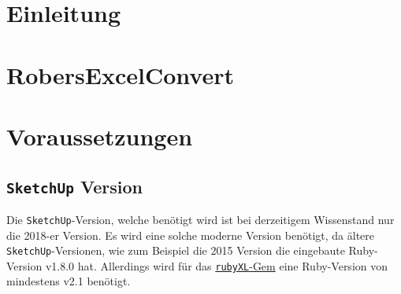 \documentclass{book}
\newcommand{\sketchup}{\texttt{SketchUp}\xspace}
\newcommand{\rubyXL}{\texttt{rubyXL}\xspace}
\begin{document}
	
	
	
	\tableofcontents
	\chapter{Einleitung}
		
	\chapter{RobersExcelConvert}
	
	\chapter{Voraussetzungen}
		\section{\sketchup Version}
			Die \sketchup-Version, welche benötigt wird ist bei derzeitigem Wissenstand nur die 2018-er Version. Es wird eine solche moderne Version benötigt, da ältere \sketchup-Versionen, wie zum Beispiel die 2015 Version die eingebaute Ruby-Version v1.8.0 hat. Allerdings wird für das \hyperref[rubyXL]{\rubyXL-Gem} eine Ruby-Version von mindestens v2.1 benötigt.
\end{document}
